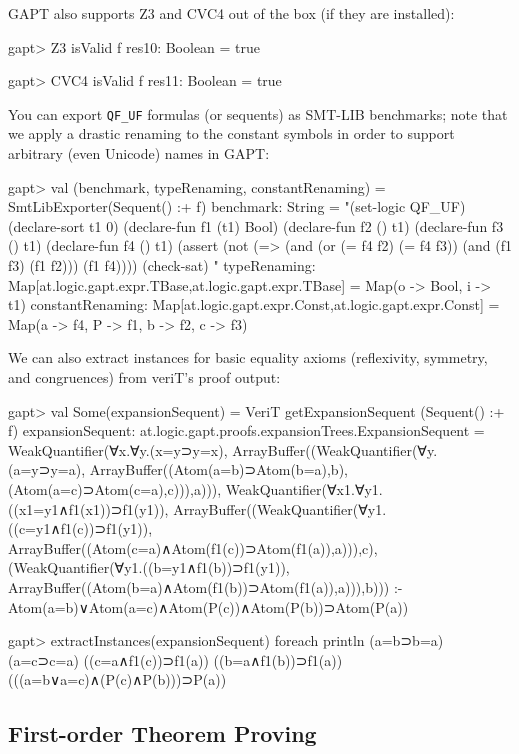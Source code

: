 \documentclass[a4paper,11pt]{article}
\begin{document}
GAPT also supports Z3 and CVC4 out of the box (if they are installed):
\begin{clilisting}
gapt> Z3 isValid f
res10: Boolean = true

gapt> CVC4 isValid f
res11: Boolean = true

\end{clilisting}

You can export \verb,QF_UF, formulas (or sequents) as SMT-LIB benchmarks;
note that we apply a drastic renaming to the constant symbols in order to
support arbitrary (even Unicode) names in GAPT:
\begin{clilisting}
gapt> val (benchmark, typeRenaming, constantRenaming) = SmtLibExporter(Sequent() :+ f)
benchmark: String =
"(set-logic QF_UF)
(declare-sort t1 0)
(declare-fun f1 (t1) Bool)
(declare-fun f2 () t1)
(declare-fun f3 () t1)
(declare-fun f4 () t1)
(assert (not (=> (and (or (= f4 f2) (= f4 f3)) (and (f1 f3) (f1 f2))) (f1 f4))))
(check-sat)
"
typeRenaming: Map[at.logic.gapt.expr.TBase,at.logic.gapt.expr.TBase] = Map(o -> Bool, i -> t1)
constantRenaming: Map[at.logic.gapt.expr.Const,at.logic.gapt.expr.Const] = Map(a -> f4, P -> f1, b -> f2, c -> f3)

\end{clilisting}

We can also extract instances for basic equality axioms (reflexivity, symmetry,
and congruences) from veriT's proof output:
\begin{clilisting}
gapt> val Some(expansionSequent) = VeriT getExpansionSequent (Sequent() :+ f)
expansionSequent: at.logic.gapt.proofs.expansionTrees.ExpansionSequent = WeakQuantifier(∀x.∀y.(x=y⊃y=x), ArrayBuffer((WeakQuantifier(∀y.(a=y⊃y=a), ArrayBuffer((Atom(a=b)⊃Atom(b=a),b), (Atom(a=c)⊃Atom(c=a),c))),a))), WeakQuantifier(∀x1.∀y1.((x1=y1∧f1(x1))⊃f1(y1)), ArrayBuffer((WeakQuantifier(∀y1.((c=y1∧f1(c))⊃f1(y1)), ArrayBuffer((Atom(c=a)∧Atom(f1(c))⊃Atom(f1(a)),a))),c), (WeakQuantifier(∀y1.((b=y1∧f1(b))⊃f1(y1)), ArrayBuffer((Atom(b=a)∧Atom(f1(b))⊃Atom(f1(a)),a))),b))) :- Atom(a=b)∨Atom(a=c)∧Atom(P(c))∧Atom(P(b))⊃Atom(P(a))

gapt> extractInstances(expansionSequent) foreach println
(a=b⊃b=a)
(a=c⊃c=a)
((c=a∧f1(c))⊃f1(a))
((b=a∧f1(b))⊃f1(a))
(((a=b∨a=c)∧(P(c)∧P(b)))⊃P(a))

\end{clilisting}

\subsection{First-order Theorem Proving}
\end{document}
